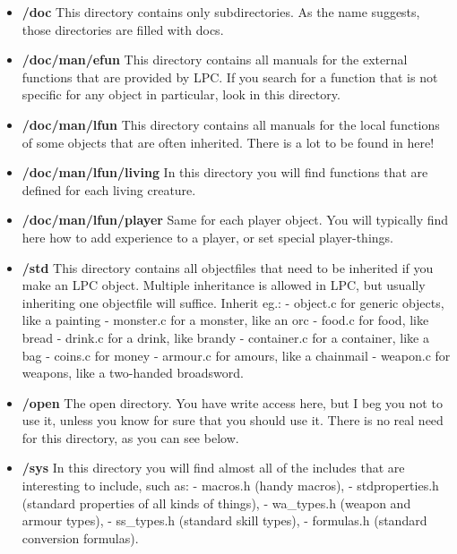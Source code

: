 \begin{itemize}
\item{\bf /doc}
      This directory contains only subdirectories. As the name suggests,
      those directories are filled with docs.

\item{\bf /doc/man/efun}
      This directory contains all manuals for the external functions that
      are provided by LPC. If you search for a function that is not specific
      for any object in particular, look in this directory.

\item{\bf /doc/man/lfun}
      This directory contains all manuals for the local functions of some
      objects that are often inherited. There is a lot to be found in here!

\item{\bf /doc/man/lfun/living}
      In this directory you will find functions that are defined for each
      living creature.

\item{\bf /doc/man/lfun/player}
      Same for each player object. You will typically find here how to
      add experience to a player, or set special player-things.

\item{\bf /std}
      This directory contains all objectfiles that need to be inherited
      if you make an LPC object. Multiple inheritance is allowed in LPC,
      but usually inheriting one objectfile will suffice. Inherit eg.:
         - object.c       for generic objects, like a painting
         - monster.c      for a monster, like an orc
         - food.c         for food, like bread
         - drink.c        for a drink, like brandy
         - container.c    for a container, like a bag
         - coins.c        for money
         - armour.c       for amours, like a chainmail
         - weapon.c       for weapons, like a two-handed broadsword.

\item{\bf /open}
      The open directory. You have write access here, but I beg you
      not to use it, unless you know for sure that you should use it.
      There is no real need for this directory, as you can see below.

\item{\bf /sys}
      In this directory you will find almost all of the includes that are
      interesting to include, such as:
         - macros.h        (handy macros),
         - stdproperties.h (standard properties of all kinds of things),
         - wa\_types.h      (weapon and armour types),
         - ss\_types.h      (standard skill types),
         - formulas.h      (standard conversion formulas).


\end{itemize}
